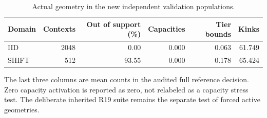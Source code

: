 \documentclass[11pt,letterpaper]{article}
\theoremstyle{definition}
\newcommand{\1}{\mathbf 1}
\begin{document}
\begin{table}[tbp]\centering\small
\caption{Actual geometry in the new independent validation populations.}\label{tab:r22-geometry}
\begin{tabular}{lrrrrr}
\toprule
Domain & Contexts & Out of support (\%) & Capacities & Tier bounds & Kinks\\
\midrule
IID & 2048 & 0.00 & 0.000 & 0.063 & 61.749\\
SHIFT & 512 & 93.55 & 0.000 & 0.178 & 65.424\\
\bottomrule
\end{tabular}
\par\smallskip\begin{minipage}{.98\textwidth}\small The last three columns are mean counts in the audited full reference decision. Zero capacity activation is reported as zero, not relabeled as a capacity stress test. The deliberate inherited R19 suite remains the separate test of forced active geometries.\end{minipage}
\end{table}

\end{document}
